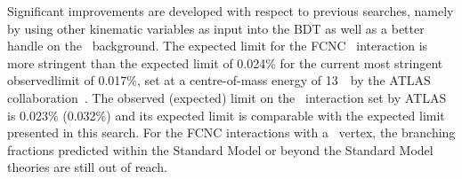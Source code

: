Significant improvements are developed with respect to previous searches, namely by using other kinematic variables as input into the BDT as well as a better handle on the \NPL\ background.  The expected limit for the FCNC \Zut\ interaction is more stringent than the expected limit of 0.024\% for the current  most stringent observedlimit of 0.017\%, set at a centre-of-mass energy of 13~\TeV\ by the ATLAS collaboration~\cite{ATLAS-CONF-2017-070}.  The  observed (expected) limit on the \Zct\ interaction set by ATLAS is 0.023\% (0.032\%) and its expected limit is comparable with the expected limit presented  in this search.  For the FCNC interactions with a \tZq\ vertex, the branching fractions predicted within the Standard Model or beyond the Standard Model theories are still out of reach. 



